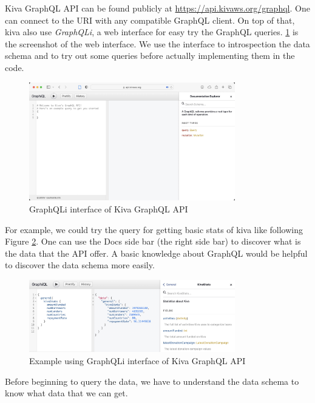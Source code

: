 Kiva GraphQL API can be found publicly at \url{https://api.kivaws.org/graphql}.
One can connect to the URI with any compatible GraphQL client.
On top of that, kiva also use \textit{GraphQLi}, a web interface for easy try the GraphQL queries.
\ref{fig:grapqli} is the screenshot of the web interface.
We use the interface to introspection the data schema and to try out some queries before actually implementing them in the code.

\begin{figure}[H]
	\centering
	\includegraphics[width=0.8\textwidth]{images/grapqli.png}
	\caption{GraphQLi interface of Kiva GraphQL API}
	\label{fig:grapqli}
\end{figure}

For example, we could try the query for getting basic stats of kiva like following Figure \ref{fig:graphqli-example}.
One can use the Docs side bar (the right side bar) to discover what is the data that the API offer.
A basic knowledge about GraphQL would be helpful to discover the data schema more easily.

\begin{figure}[H]
	\centering
	\includegraphics[width=0.8\textwidth]{images/graphqli-example.png}
	\caption{Example using GraphQLi interface of Kiva GraphQL API \parencite{graphqli-example}}
	\label{fig:graphqli-example}
\end{figure}


Before beginning to query the data, we have to understand the data schema to know what data that we can get.



